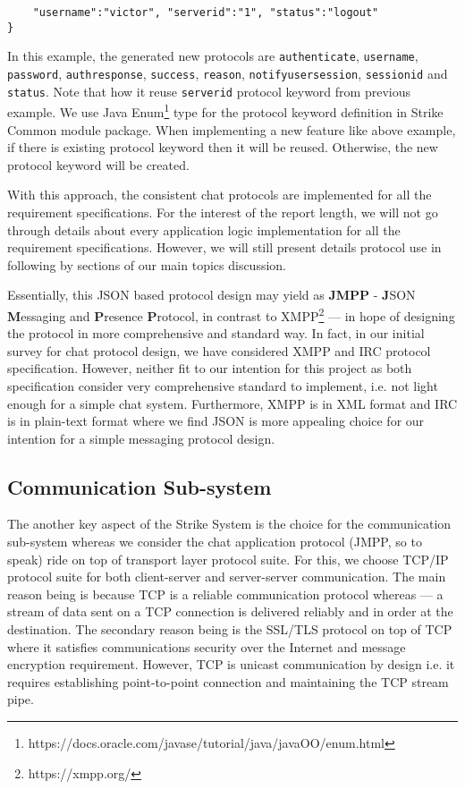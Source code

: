 \documentclass[dareport.tex]{subfiles}
\begin{document}
\begin{enumerate}[leftmargin=*]
\begin{small}
\begin{verbatim}
    "username":"victor", "serverid":"1", "status":"logout"
}
\end{verbatim}
\end{small}
In this example, the generated new protocols are \verb|authenticate|, \verb|username|, \verb|password|, \verb|authresponse|, \verb|success|, \verb|reason|, \verb|notifyusersession|, \verb|sessionid| and \verb|status|. Note that how it reuse \verb|serverid| protocol keyword from previous example. We use Java Enum\footnote{https://docs.oracle.com/javase/tutorial/java/javaOO/enum.html} type for the protocol keyword definition in Strike Common module package. When implementing a new feature like above example, if there is existing protocol keyword then it will be reused. Otherwise, the new protocol keyword will be created. 
\end{enumerate}

With this approach, the consistent chat protocols are implemented for all the requirement specifications. For the interest of the report length, we will not go through details about every application logic implementation for all the requirement specifications. However, we will still present details protocol use in following by sections of our main topics discussion.

Essentially, this JSON based protocol design may yield as \textbf{JMPP} - \textbf{J}SON \textbf{M}essaging and \textbf{P}resence \textbf{P}rotocol, in contrast to XMPP\footnote{https://xmpp.org/} --- in hope of designing the protocol in more comprehensive and standard way. In fact, in our initial survey for chat protocol design, we have considered XMPP and IRC protocol specification. However, neither fit to our intention for this project as both specification consider very comprehensive standard to implement, i.e. not light enough for a simple chat system. Furthermore, XMPP is in XML format\cite{xmpp} and IRC is in plain-text format\cite{irc} where we find JSON is more appealing choice for our intention for a simple messaging protocol design.

\subsection{Communication Sub-system}
The another key aspect of the Strike System is the choice for the communication sub-system whereas we consider the chat application protocol (JMPP, so to speak) ride on top of transport layer protocol suite. For this, we choose TCP/IP protocol suite for both client-server and server-server communication. The main reason being is because TCP is a reliable communication protocol whereas --- a stream of data sent on a TCP connection is delivered reliably and in order at the destination\cite{tcp}. The secondary reason being is the SSL/TLS protocol on top of TCP where it satisfies communications security over the Internet and message encryption requirement\cite{tls}. However, TCP is unicast communication by design i.e. it requires establishing point-to-point connection and maintaining the TCP stream pipe. 
\end{document}
